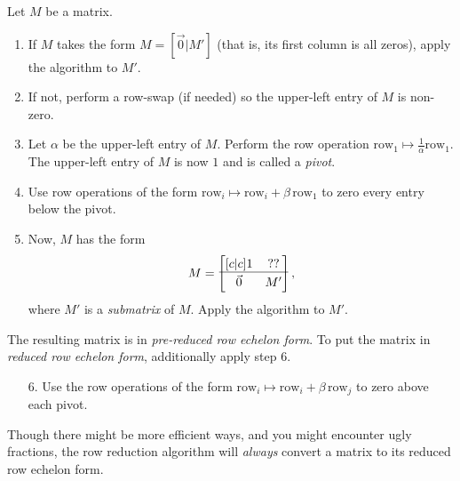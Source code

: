 	\begin{definition}
		Let $M$ be a matrix.
		\begin{enumerate}
			\item If $M$ takes the form $M=[\vec 0|M']$ (that is, its first column
			is all zeros), apply the algorithm to $M'$.
			\item If not, perform a row-swap (if needed) so the upper-left entry of $M$ is
				non-zero.
			\item Let $\alpha$ be the upper-left entry of $M$. 
				Perform the row operation $\text{row}_1\mapsto \tfrac{1}{\alpha}\text{row}_1$.
				The upper-left entry of $M$ is now $1$ and is called a 
				\emph{pivot}.
			\item Use row operations of the form $\text{row}_i\mapsto \text{row}_i+\beta\,\text{row}_1$
			to zero every entry below the pivot.
			\item Now, $M$ has the form
			\[
				M=\begin{bmatrix}[c|c]
					1 & ??\\
					\hline\\[\dimexpr-\normalbaselineskip+2pt]
					\vec 0 & M'
				\end{bmatrix},
			\]
			where $M'$ is a {\it submatrix} of $M$.
			Apply the algorithm to $M'$.

		\end{enumerate}

		The resulting matrix is in \emph{pre-reduced row echelon form}. To put the matrix in 
		\emph{reduced row echelon form}, additionally apply step 6.
		\begin{enumerate}
			\item[6.] Use the row operations of the form $\text{row}_i\mapsto \text{row}_i+\beta\,\text{row}_j$
			to zero above each pivot.
		\end{enumerate}
	\end{definition}

	Though there might be more efficient ways, and you might encounter ugly fractions, the row reduction algorithm will
	\emph{always} convert a matrix to its reduced row echelon form.

